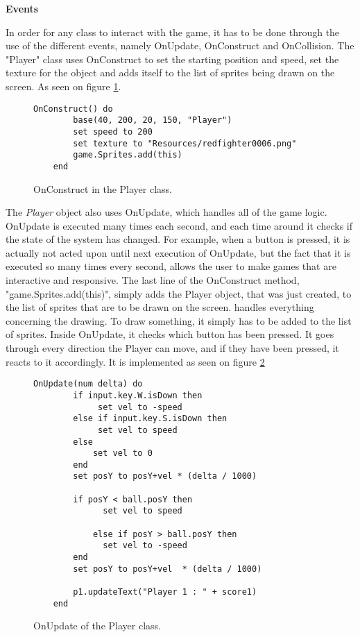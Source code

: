 \textbf{Events}

In order for any class to interact with the game, it has to be done through the use of the different events, namely OnUpdate, OnConstruct and OnCollision.
The "Player" class uses OnConstruct to set the starting position and speed, set the texture for the object and adds itself to the list of sprites being drawn on the screen. As seen on figure \ref{fig:playerConstr}.

\begin{figure}[H]
    \centering
    \begin{lstlisting}[style=gglang]
    OnConstruct() do
        base(40, 200, 20, 150, "Player")
        set speed to 200
        set texture to "Resources/redfighter0006.png"
        game.Sprites.add(this)
    end
    \end{lstlisting}
    \caption{OnConstruct in the Player class.}\label{fig:playerConstr}
\end{figure}

The \textit{Player} object also uses OnUpdate, which handles all of the game logic. OnUpdate is executed many times each second, and each time around it checks if the state of the system has changed. For example, when a button is pressed, it is actually not acted upon until next execution of OnUpdate, but the fact that it is executed so many times every second, allows the user to make games that are interactive and responsive. The last line of the OnConstruct method, "game.Sprites.add(this)", simply adds the Player object, that was just created, to the list of sprites that are to be drawn on the screen. \lang{} handles everything concerning the drawing. To draw something, it simply has to be added to the list of sprites. 
Inside OnUpdate, it checks which button has been pressed. It goes through every direction the Player can move, and if they have been pressed, it reacts to it accordingly. It is implemented as seen on figure \ref{fig:tutupdate}

\begin{figure}[H]
    \centering
    \begin{lstlisting}[style=gglang]
    OnUpdate(num delta) do
        if input.key.W.isDown then
             set vel to -speed
        else if input.key.S.isDown then
             set vel to speed
        else
            set vel to 0
        end
        set posY to posY+vel * (delta / 1000)

        if posY < ball.posY then 
              set vel to speed

            else if posY > ball.posY then
              set vel to -speed
        end
        set posY to posY+vel  * (delta / 1000)

        p1.updateText("Player 1 : " + score1)
    end
    \end{lstlisting}
    \caption{OnUpdate of the Player class.}\label{fig:tutupdate}
\end{figure}

